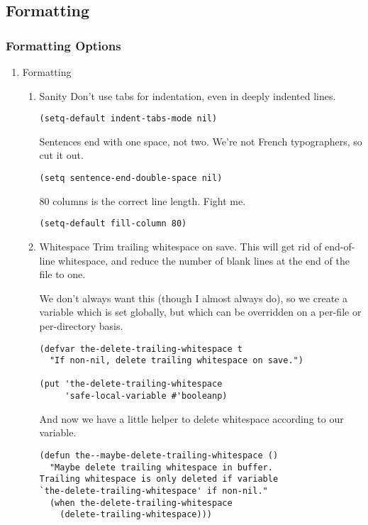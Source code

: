 \documentclass[11pt]{article}
\begin{document}
\subsection{Formatting}
\label{sec:org390859e}
\subsubsection{Formatting Options}
\label{sec:org45d1a20}
\begin{enumerate}
\item Formatting
\label{sec:orgb6fab00}
\begin{enumerate}
\item Sanity
\label{sec:orgada7936}
Don't use tabs for indentation, even in deeply indented lines.

\begin{verbatim}
(setq-default indent-tabs-mode nil)
\end{verbatim}

Sentences end with one space, not two. We're not French typographers,
so cut it out.

\begin{verbatim}
(setq sentence-end-double-space nil)
\end{verbatim}

80 columns is the correct line length. Fight me.
\begin{verbatim}
(setq-default fill-column 80)
\end{verbatim}

\item Whitespace
\label{sec:orgfc0b955}
Trim trailing whitespace on save. This will get rid of end-of-line
whitespace, and reduce the number of blank lines at the end of the
file to one.

We don't always want this (though I almost always do), so we create a
variable which is set globally, but which can be overridden on a
per-file or per-directory basis.

\begin{verbatim}
(defvar the-delete-trailing-whitespace t
  "If non-nil, delete trailing whitespace on save.")

(put 'the-delete-trailing-whitespace
     'safe-local-variable #'booleanp)
\end{verbatim}

And now we have a little helper to delete whitespace according to our
variable.

\begin{verbatim}
(defun the--maybe-delete-trailing-whitespace ()
  "Maybe delete trailing whitespace in buffer.
Trailing whitespace is only deleted if variable
`the-delete-trailing-whitespace' if non-nil."
  (when the-delete-trailing-whitespace
    (delete-trailing-whitespace)))
\end{verbatim}


\end{enumerate}
\end{enumerate}
\end{document}
